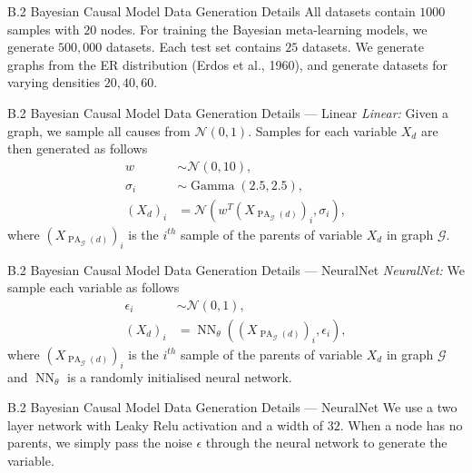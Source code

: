\documentclass[aspectratio=169,10pt]{beamer}
\begin{document}
\begin{frame}{B.2 Bayesian Causal Model Data Generation Details}
All datasets contain $1000$ samples with $20$ nodes. For training the Bayesian meta-learning models, we generate $500,000$ datasets. Each test set contains $25$ datasets. We generate graphs from the ER distribution (Erdos et al., 1960), and generate datasets for varying densities $20, 40, 60$.
\end{frame}

\begin{frame}{B.2 Bayesian Causal Model Data Generation Details --- Linear}
\textit{Linear:}\quad
Given a graph, we sample all causes from $\mathcal{N}(0,1)$. Samples for each variable $X_d$ are then generated as follows
\begin{align*}
    w &\sim \mathcal{N}(0,10), \\
    \sigma_i &\sim \operatorname{Gamma}(2.5, 2.5), \\
    (X_d)_i &= \mathcal{N}\left(w^T \left(X_{\operatorname{PA}_{\mathcal{G}}(d)}\right)_i, \sigma_i \right),
\end{align*}
where $\left(X_{\operatorname{PA}_{\mathcal{G}}(d)}\right)_i$ is the $i^{th}$ sample of the parents of variable $X_d$ in graph $\mathcal{G}$.
\end{frame}

\begin{frame}{B.2 Bayesian Causal Model Data Generation Details --- NeuralNet}
\textit{NeuralNet:}\quad
We sample each variable as follows
\begin{align*}
    \epsilon_i &\sim \mathcal{N}(0,1), \\
    (X_d)_i  &= \operatorname{NN}_{\theta}\left(\left(X_{\operatorname{PA}_{\mathcal{G}}(d)}\right)_i, \epsilon_i \right),
\end{align*}
where $\left(X_{\operatorname{PA}_{\mathcal{G}}(d)}\right)_i$ is the $i^{th}$ sample of the parents of variable $X_d$ in graph $\mathcal{G}$ and $\operatorname{NN}_{\theta}$ is a randomly initialised neural network.
\end{frame}

\begin{frame}{B.2 Bayesian Causal Model Data Generation Details --- NeuralNet}
We use a two layer network with Leaky Relu activation and a width of $32$. When a node has no parents, we simply pass the noise $\epsilon$ through the neural network to generate the variable.
\end{frame}
\end{document}
